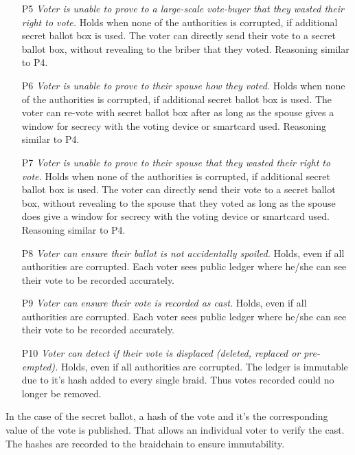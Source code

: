 \documentclass[12pt,a4paper]{article}
\begin{document}
\begin{itemize}
\item
[P5] \textit{Voter is unable to prove to a large-scale vote-buyer that they wasted their right to vote.} Holds when none of the authorities is corrupted, if additional secret ballot box is used. The voter can directly send their vote to a secret ballot box, without revealing to the briber that they voted. Reasoning similar to P4.\par
\item
[P6] \textit{Voter is unable to prove to their spouse how they voted.} Holds when none of the authorities is corrupted, if additional secret ballot box is used. The voter can re-vote with secret ballot box after as long as the spouse gives a window for secrecy with the voting device or smartcard used. Reasoning similar to P4.\par
\item
[P7] \textit{Voter is unable to prove to their spouse that they wasted their right to vote.} Holds when none of the authorities is corrupted, if additional secret ballot box is used. The voter can directly send their vote to a secret ballot box, without revealing to the spouse that they voted as long as the spouse does give a window for secrecy with the voting device or smartcard used. Reasoning similar to P4.\par
\item
[P8] \textit{Voter can ensure their ballot is not accidentally spoiled.} Holds, even if all authorities are corrupted. Each voter sees public ledger where he/she can see their vote to be recorded accurately.\par
\item
[P9] \textit{Voter can ensure their vote is recorded as cast.} Holds, even if all authorities are corrupted. Each voter sees public ledger where he/she can see their vote to be recorded accurately.\par
\item
[P10] \textit{Voter can detect if their vote is displaced (deleted, replaced or pre-empted).} Holds, even if all authorities are corrupted. The ledger is immutable due to it's hash added to every single braid. Thus votes recorded could no longer be removed.\par
\end{itemize}
In the case of the secret ballot, a hash of the vote and it's the corresponding value of the vote is published. That allows an individual voter to verify the cast. The hashes are recorded to the braidchain to ensure immutability.\par
\end{document}

